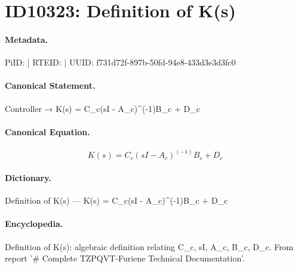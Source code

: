 \section*{ID10323: Definition of K(s)}
\paragraph{Metadata.}
PiID:  | RTEID:  | UUID: f731d72f-897b-50fd-94e8-433d3e3d3fc0

\paragraph{Canonical Statement.}
Controller → K(s) = C\_c(sI - A\_c)\textasciicircum{}(-1)B\_c + D\_c

\paragraph{Canonical Equation.}
\[
K(s) = C_c(sI - A_c)^(-1)B_c + D_c
\]

\paragraph{Dictionary.}
Definition of K(s) — K(s) = C\_c(sI - A\_c)\textasciicircum{}(-1)B\_c + D\_c

\paragraph{Encyclopedia.}
Definition of K(s): algebraic definition relating C\_c, sI, A\_c, B\_c, D\_c. From report '\# Complete TZPQVT-Furiene Technical Documentation'.
